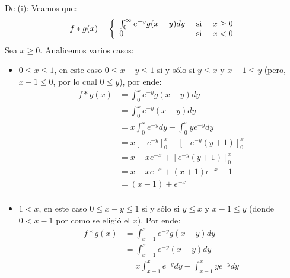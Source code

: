 \documentclass[12pt]{report}
\newcounter{it}
\theoremstyle{largebreak}
\begin{document}
\begin{sol}
        De (i): Veamos que:
        \begin{equation*}
            \begin{split}
                f*g(x)&=\left\{
                    \begin{array}{lcr}
                       \int_0^\infty e^{-y}g(x-y)dy & \textup{ si } & x\geq0\\
                       0 & \textup{ si } & x<0\\ 
                    \end{array}
                \right.\\
            \end{split}
        \end{equation*}
        Sea $x\geq0$. Analicemos varios casos:
        \begin{itemize}
            \item $0\leq x\leq 1$, en este caso $0\leq x-y\leq 1$ si y sólo si  $y\leq x$ y $x-1\leq y$ (pero, $x-1\leq 0$, por lo cual $0\leq y$), por ende:
            \begin{equation*}
                \begin{split}
                    f*g(x)&=\int_0^x e^{-y}g(x-y)dy\\
                    &=\int_0^x e^{-y}(x-y)dy\\
                    &=x\int_0^x e^{-y}dy-\int_0^x ye^{-y}dy\\
                    &=x\left[-e^{-y} \right]_0^x-\left[-e^{-y}(y+1) \right]_0^x\\
                    &=x-xe^{-x}+\left[e^{-y}(y+1) \right]_0^x\\
                    &=x-xe^{-x}+(x+1)e^{-x}-1\\
                    &=(x-1)+e^{-x}\\
                \end{split}
            \end{equation*}
            \item $1<x$, en este caso $0\leq x-y\leq 1$ si y sólo si $y\leq x$ y $x-1\leq y$ (donde $0<x-1$ por como se eligió el $x$). Por ende:
            \begin{equation*}
                \begin{split}
                    f*g(x)&=\int_{x-1}^x e^{-y}g(x-y)dy\\
                    &=\int_{x-1}^x e^{-y}(x-y)dy\\
                    &=x\int_{x-1}^x e^{-y}dy-\int_{x-1}^xye^{-y}dy\\

\end{split}
\end{equation*}
\end{itemize}
\end{sol}
\end{document}
